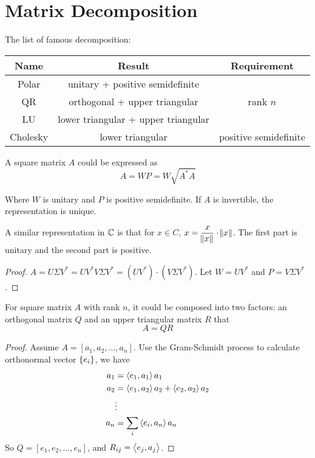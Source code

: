 \section{Matrix Decomposition}

The list of famous decomposition:

\begin{table}[H]
\centering
\begin{tabular}[t]{|c|c|c|}
\hline
Name & Result & Requirement \\ \hline
Polar & unitary + positive semidefinite & \\ \hline
QR & orthogonal + upper triangular & rank $n$ \\ \hline
LU & lower triangular + upper triangular & \\ \hline
Cholesky & lower triangular & positive semidefinite \\ \hline
\end{tabular}
\end{table}

\begin{theorem}
    A square matrix $A$ could be expressed as 
    \begin{equation}
        A = WP = W \sqrt{A^*A}
    \end{equation}
    
    Where $W$ is unitary and $P$ is positive semidefinite. If $A$ is invertible, the representation is unique. 
    
    A similar representation in $\mathbb{C}$ is that for $x \in C$, $\displaystyle x = \frac{x}{\norm{x}} \cdot \norm{x}$. The first part is unitary and the second part is positive.
\end{theorem}
\begin{proof}
    $A = U\Sigma V^* = U V^* V \Sigma V^* = (U V^*) \cdot (V \Sigma V^*)$. Let $W = U V^*$ and $P = V \Sigma V^*$.
\end{proof}


\begin{theorem}[QR Decomposition]
    For square matrix $A$ with rank $n$, it could be composed into two factors: an orthogonal matrix $Q$ and an upper triangular matrix $R$ that 
    \begin{equation}
        A = QR
    \end{equation}
\end{theorem}
\begin{proof}
    Assume $A=[a_1, a_2, ..., a_n]$. Use the Gram-Schmidt process to calculate orthonormal vector $\set{e_i}$, we have
    \begin{equation*}
        \begin{aligned}
            a_1 &= \left\langle \displaystyle e_1, a_1 \right\rangle a_1 \\
            a_2 &= \left\langle \displaystyle e_1, a_2 \right\rangle a_2 + \left\langle \displaystyle e_2, a_2 \right\rangle a_2\\
            &\vdots \\
            a_n &= \sum_i \left\langle \displaystyle e_i, a_n \right\rangle a_n
        \end{aligned}
    \end{equation*}
    So $Q=[e_1, e_2, ..., e_n]$, and $R_{ij} = \left\langle \displaystyle e_j, a_j \right\rangle$.
\end{proof}


